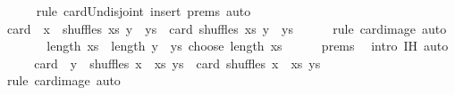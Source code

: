 \begin{isabellebody}
\ \ \ \ \isamarkupfalse%
\ {\isacharparenleft}{\kern0pt}rule\ card{\isacharunderscore}{\kern0pt}Un{\isacharunderscore}{\kern0pt}disjoint{\isacharparenright}{\kern0pt}\ {\isacharparenleft}{\kern0pt}insert\ {\isachardoublequoteopen}{}{\isachardot}{\kern0pt}prems{\isachardoublequoteclose}{\isacharcomma}{\kern0pt}\ auto{\isacharparenright}{\kern0pt}\isanewline
\ \ \isamarkupfalse%
\ \isamarkupfalse%
\ {\isachardoublequoteopen}card\ {\isacharparenleft}{\kern0pt}{\isacharparenleft}{\kern0pt}{\isacharhash}{\kern0pt}{\isacharparenright}{\kern0pt}\ x\ {\isacharbackquote}{\kern0pt}\ shuffles\ xs\ {\isacharparenleft}{\kern0pt}y\ {\isacharhash}{\kern0pt}\ ys{\isacharparenright}{\kern0pt}{\isacharparenright}{\kern0pt}\ {\isacharequal}{\kern0pt}\ card\ {\isacharparenleft}{\kern0pt}shuffles\ xs\ {\isacharparenleft}{\kern0pt}y\ {\isacharhash}{\kern0pt}\ ys{\isacharparenright}{\kern0pt}{\isacharparenright}{\kern0pt}{\isachardoublequoteclose}\isanewline
\ \ \ \ \isamarkupfalse%
\ {\isacharparenleft}{\kern0pt}rule\ card{\isacharunderscore}{\kern0pt}image{\isacharparenright}{\kern0pt}\ auto\isanewline
\ \ \isamarkupfalse%
\ \isamarkupfalse%
\ {\isachardoublequoteopen}{\isasymdots}\ {\isacharequal}{\kern0pt}\ {\isacharparenleft}{\kern0pt}length\ xs\ {\isacharplus}{\kern0pt}\ length\ {\isacharparenleft}{\kern0pt}y\ {\isacharhash}{\kern0pt}\ ys{\isacharparenright}{\kern0pt}{\isacharparenright}{\kern0pt}\ choose\ length\ xs{\isachardoublequoteclose}\isanewline
\ \ \ \ \isamarkupfalse%
\ {\isachardoublequoteopen}{}{\isachardot}{\kern0pt}prems{\isachardoublequoteclose}\ \isamarkupfalse%
\ {\isacharparenleft}{\kern0pt}intro\ {\isachardoublequoteopen}{}{\isachardot}{\kern0pt}IH{\isachardoublequoteclose}{\isacharparenright}{\kern0pt}\ auto\isanewline
\ \ \isamarkupfalse%
\ \isamarkupfalse%
\ {\isachardoublequoteopen}card\ {\isacharparenleft}{\kern0pt}{\isacharparenleft}{\kern0pt}{\isacharhash}{\kern0pt}{\isacharparenright}{\kern0pt}\ y\ {\isacharbackquote}{\kern0pt}\ shuffles\ {\isacharparenleft}{\kern0pt}x\ {\isacharhash}{\kern0pt}\ xs{\isacharparenright}{\kern0pt}\ ys{\isacharparenright}{\kern0pt}\ {\isacharequal}{\kern0pt}\ card\ {\isacharparenleft}{\kern0pt}shuffles\ {\isacharparenleft}{\kern0pt}x\ {\isacharhash}{\kern0pt}\ xs{\isacharparenright}{\kern0pt}\ ys{\isacharparenright}{\kern0pt}{\isachardoublequoteclose}\isanewline
\ \ \ \ \isamarkupfalse%
\ {\isacharparenleft}{\kern0pt}rule\ card{\isacharunderscore}{\kern0pt}image{\isacharparenright}{\kern0pt}\ auto\isanewline

\end{isabellebody}
